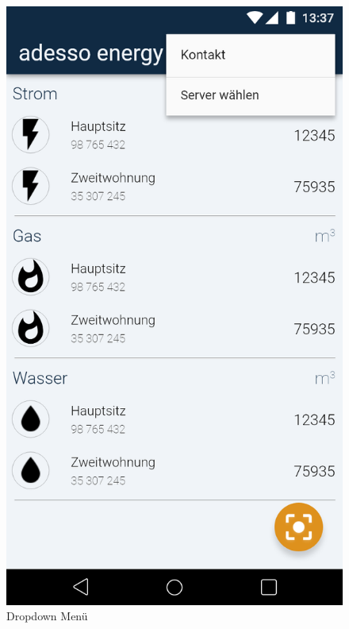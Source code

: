 \begin{figure}[h]
	\includegraphics[scale = 0.22]{img/AndroidMockup/dropdown}		
	\caption{Dropdown Menü}
	\label{fig:mock-pw}
\end{figure}

